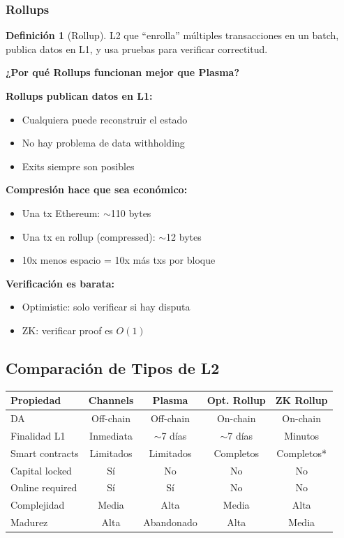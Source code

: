 \documentclass[11pt,a4paper,twoside,openright]{book}
\theoremstyle{definition}
\newtheorem{definition}{Definición}[chapter]
\theoremstyle{plain}
\theoremstyle{remark}
\begin{document}
\subsubsection{Rollups}

\begin{definition}[Rollup]
L2 que ``enrolla'' múltiples transacciones en un batch, publica datos en L1, y usa pruebas para verificar correctitud.
\end{definition}

\begin{keyidea}
\textbf{¿Por qué Rollups funcionan mejor que Plasma?}

\textbf{Rollups publican datos en L1:}
\begin{itemize}
    \item Cualquiera puede reconstruir el estado
    \item No hay problema de data withholding
    \item Exits siempre son posibles
\end{itemize}

\textbf{Compresión hace que sea económico:}
\begin{itemize}
    \item Una tx Ethereum: $\sim$110 bytes
    \item Una tx en rollup (compressed): $\sim$12 bytes
    \item 10x menos espacio = 10x más txs por bloque
\end{itemize}

\textbf{Verificación es barata:}
\begin{itemize}
    \item Optimistic: solo verificar si hay disputa
    \item ZK: verificar proof es $O(1)$
\end{itemize}
\end{keyidea}

\subsection{Comparación de Tipos de L2}

\begin{center}
\begin{tabular}{lcccc}
\toprule
\textbf{Propiedad} & \textbf{Channels} & \textbf{Plasma} & \textbf{Opt. Rollup} & \textbf{ZK Rollup} \\
\midrule
DA & Off-chain & Off-chain & On-chain & On-chain \\
Finalidad L1 & Inmediata & $\sim$7 días & $\sim$7 días & Minutos \\
Smart contracts & Limitados & Limitados & Completos & Completos* \\
Capital locked & Sí & No & No & No \\
Online required & Sí & Sí & No & No \\
Complejidad & Media & Alta & Media & Alta \\
Madurez & Alta & Abandonado & Alta & Media \\
\bottomrule
\end{tabular}
\end{center}
\end{document}
